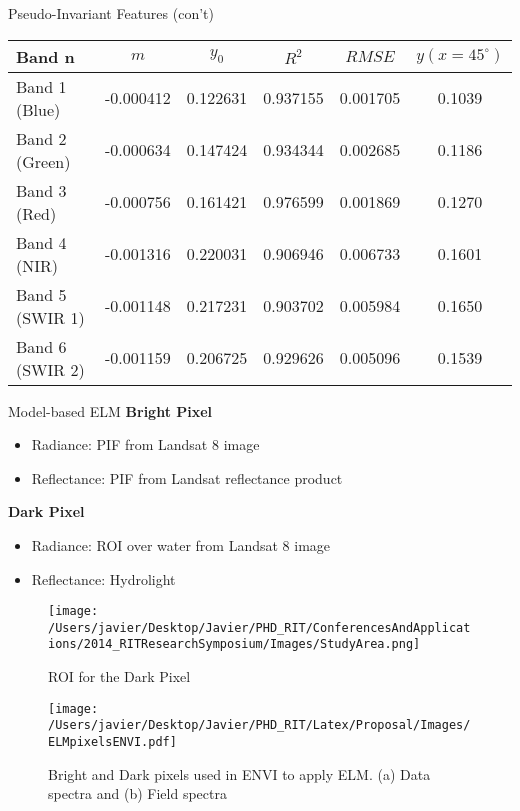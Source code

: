 \documentclass{beamer}
\begin{document}
\begin{frame}{}
\begin{columns}[t]
\begin{column}{.3\linewidth}
\begin{block}{Pseudo-Invariant Features (con't)}
\begin{table}[!ht]
\begin{tabular}{l|c|c|c|c|c}
 \bfseries{Band n} & \bfseries{$m$}      & \bfseries{$y_0$}    & \bfseries{$R^2$}     & \bfseries{$RMSE$} & $y(x=45^\circ)$   \\ \hline \hline
 Band 1 (Blue) 		& -0.000412 & 0.122631 & 0.937155 & 0.001705 &      0.1039\\
 Band 2 (Green) 	& -0.000634 & 0.147424 & 0.934344 & 0.002685 &      0.1186\\
 Band 3 (Red) 		& -0.000756 & 0.161421 & 0.976599 & 0.001869 &      0.1270\\
 Band 4 (NIR) 		& -0.001316 & 0.220031 & 0.906946 & 0.006733 &      0.1601\\
 Band 5 (SWIR 1) 	& -0.001148 & 0.217231 & 0.903702 & 0.005984 &      0.1650\\
 Band 6 (SWIR 2) 	& -0.001159 & 0.206725 & 0.929626 & 0.005096 &      0.1539\\  
 \end{tabular}
\end{table}
\end{block}
\begin{block}{Model-based ELM}
{\large \bf Bright Pixel}
\begin{itemize}
 		\item Radiance: PIF from Landsat 8 image
 		\item Reflectance: PIF from Landsat reflectance product
\end{itemize}
\vspace{0.3cm}
{\large \bf Dark Pixel}

\begin{itemize}
		\item Radiance: ROI over water from Landsat 8 image
		\item Reflectance: Hydrolight
\end{itemize}

\begin{figure}[htb]
  \centering
		\texttt{[image: /Users/javier/Desktop/Javier/PHD\_RIT/ConferencesAndApplications/2014\_RITResearchSymposium/Images/StudyArea.png]}
  \caption{ROI for the Dark Pixel \label{fig:ROIDark} } 
\end{figure}

\begin{figure}[htb]
  \centering
  \texttt{[image: /Users/javier/Desktop/Javier/PHD\_RIT/Latex/Proposal/Images/ELMpixelsENVI.pdf]}
  \caption{Bright and Dark pixels used in ENVI to apply ELM. (a) Data spectra and (b) Field spectra \label{fig:ELMpxsENVI} } 
\end{figure}


\end{block}
\end{column}
\end{columns}
\end{frame}
\end{document}
